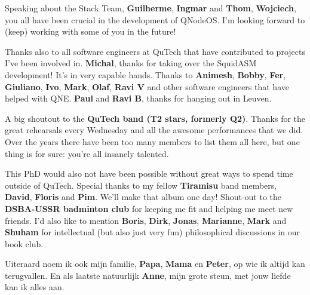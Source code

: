 Speaking about the Stack Team,
\textbf{Guilherme}, \textbf{Ingmar} and \textbf{Thom}, \textbf{Wojciech}, you all have been crucial in the development of QNodeOS.
I'm looking forward to (keep) working with some of you in the future!

Thanks also to all software engineers at QuTech that have contributed to projects I've been involved in.
\textbf{Michal}, thanks for taking over the SquidASM development! It's in very capable hands.
Thanks to \textbf{Animesh}, \textbf{Bobby}, \textbf{Fer}, \textbf{Giuliano}, \textbf{Ivo}, \textbf{Mark}, \textbf{Olaf}, \textbf{Ravi V} and other software engineers that have helped with QNE.
\textbf{Paul} and \textbf{Ravi B}, thanks for hanging out in Leuven.

A big shoutout to the \textbf{QuTech band (T2 stars, formerly Q2)}.
Thanks for the great rehearsals every Wednesday and all the awesome performances that we did.
Over the years there have been too many members to list them all here, but one thing is for sure: you're all insanely talented.

This PhD would also not have been possible without great ways to spend time outside of QuTech.
Special thanks to my fellow \textbf{Tiramisu} band members, \textbf{David}, \textbf{Floris} and \textbf{Pim}.
We'll make that album one day!
Shout-out to the \textbf{DSBA-USSR badminton club} for keeping me fit and helping me meet new friends.
I'd also like to mention \textbf{Boris}, \textbf{Dirk}, \textbf{Jonas}, \textbf{Marianne}, \textbf{Mark} and \textbf{Shuham} for intellectual (but also just very fun) philosophical discussions in our book club.

Uiteraard noem ik ook mijn familie, \textbf{Papa}, \textbf{Mama} en \textbf{Peter}, op wie ik altijd kan terugvallen.
En als laatste natuurlijk \textbf{Anne}, mijn grote steun, met jouw liefde kan ik alles aan.






